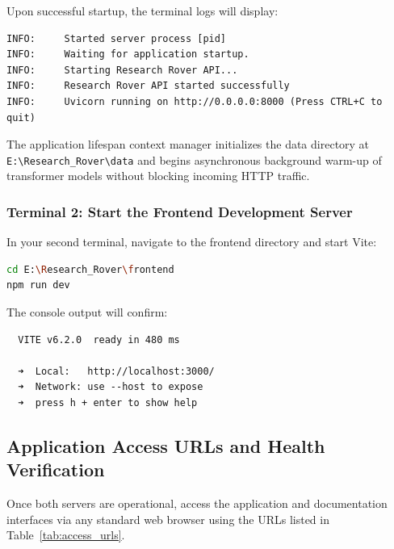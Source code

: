 \noindent Upon successful startup, the terminal logs will display:
\begin{lstlisting}
INFO:     Started server process [pid]
INFO:     Waiting for application startup.
INFO:     Starting Research Rover API...
INFO:     Research Rover API started successfully
INFO:     Uvicorn running on http://0.0.0.0:8000 (Press CTRL+C to quit)
\end{lstlisting}

\noindent The application lifespan context manager initializes the data directory at \texttt{E:\textbackslash Research\_Rover\textbackslash data} and begins asynchronous background warm-up of transformer models without blocking incoming HTTP traffic.

\subsubsection{Terminal 2: Start the Frontend Development Server}
In your second terminal, navigate to the frontend directory and start Vite:

\begin{lstlisting}[language=bash, caption={Launching Vite Frontend Server}]
cd E:\Research_Rover\frontend
npm run dev
\end{lstlisting}

\noindent The console output will confirm:
\begin{lstlisting}
  VITE v6.2.0  ready in 480 ms

  ➜  Local:   http://localhost:3000/
  ➜  Network: use --host to expose
  ➜  press h + enter to show help
\end{lstlisting}

\subsection{Application Access URLs and Health Verification}
Once both servers are operational, access the application and documentation interfaces via any standard web browser using the URLs listed in Table~\ref{tab:access_urls}.

